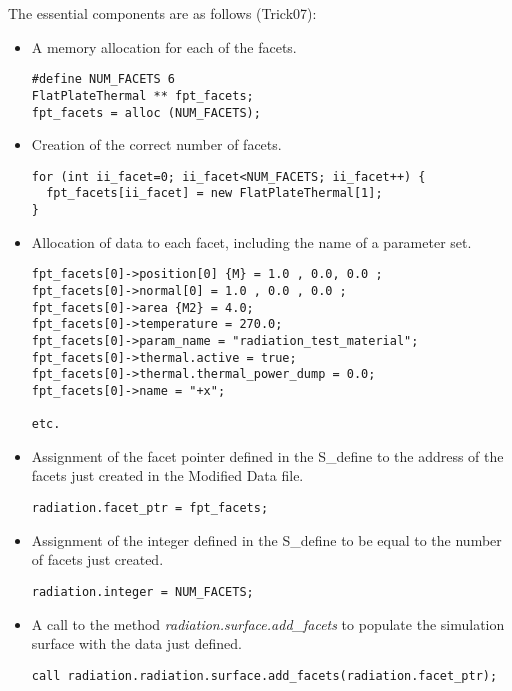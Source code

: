 The essential components are as follows (Trick07):
\begin{itemize}
\item{} A memory allocation for each of the facets.
\begin{verbatim}
#define NUM_FACETS 6
FlatPlateThermal ** fpt_facets;
fpt_facets = alloc (NUM_FACETS);
\end{verbatim}

\item{} Creation of the correct number of facets.
\begin{verbatim}
for (int ii_facet=0; ii_facet<NUM_FACETS; ii_facet++) {
  fpt_facets[ii_facet] = new FlatPlateThermal[1];
}
\end{verbatim}

\item{} Allocation of data to each facet, including the name of a parameter set.
\begin{verbatim}
fpt_facets[0]->position[0] {M} = 1.0 , 0.0, 0.0 ;
fpt_facets[0]->normal[0] = 1.0 , 0.0 , 0.0 ;
fpt_facets[0]->area {M2} = 4.0;
fpt_facets[0]->temperature = 270.0;
fpt_facets[0]->param_name = "radiation_test_material";
fpt_facets[0]->thermal.active = true;
fpt_facets[0]->thermal.thermal_power_dump = 0.0;
fpt_facets[0]->name = "+x";

etc.
\end{verbatim}

\item{} Assignment of the facet pointer defined in the S\_define to the address of the facets just created in the Modified Data file.
\begin{verbatim}
radiation.facet_ptr = fpt_facets;
\end{verbatim}

\item{}  Assignment of the integer defined in the S\_define to be equal to the number of facets just created.
\begin{verbatim}
radiation.integer = NUM_FACETS;
\end{verbatim}

\item{} A call to the method \textit{radiation.surface.add\_facets} to populate the simulation surface with the data just defined.
\begin{verbatim}
call radiation.radiation.surface.add_facets(radiation.facet_ptr);
\end{verbatim}
\end{itemize}

